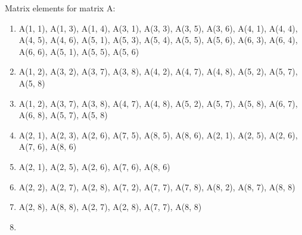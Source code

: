 \documentclass[11pt, fleqn]{article}
\begin{document}
\noindent
Matrix elements for matrix A:
\begin{enumerate}
	\item {} \begin{minipage}[t]{13cm}
													      A(1, 1), A(1, 3), A(1, 4), A(3, 1), A(3, 3), A(3, 5), A(3, 6), A(4, 1), A(4, 4), A(4, 5), A(4, 6), A(5, 1), A(5, 3), A(5, 4),
														  A(5, 5), A(5, 6), A(6, 3), A(6, 4), A(6, 6), {\color{blue} A(5, 1), A(5, 5), A(5, 6)}
													     \end{minipage}
	\item {} \begin{minipage}[t]{13cm}
														  A(1, 2), A(3, 2), A(3, 7), A(3, 8), A(4, 2), A(4, 7), A(4, 8), A(5, 2), A(5, 7), A(5, 8)
													     \end{minipage}
	\item {} \begin{minipage}[t]{13cm}
														  A(1, 2), A(3, 7), A(3, 8), A(4, 7), A(4, 8), A(5, 2), A(5, 7), A(5, 8), A(6, 7), A(6, 8), {\color{blue} A(5, 7), A(5, 8)}
														 \end{minipage} 
	\item {} \begin{minipage}[t]{13cm}
														 A(2, 1), A(2, 3), A(2, 6), A(7, 5), A(8, 5), A(8, 6), {\color{blue} A(2, 1), A(2, 5), A(2, 6), A(7, 6), A(8, 6)}
														 \end{minipage}
	\item {} \begin{minipage}[t]{13cm}
														  A(2, 1), A(2, 5), A(2, 6), A(7, 6), A(8, 6)
														 \end{minipage} 
	\item {} \begin{minipage}[t]{13cm}
														  A(2, 2), A(2, 7), A(2, 8), A(7, 2), A(7, 7), A(7, 8), A(8, 2), A(8, 7), A(8, 8)
														 \end{minipage} 
	\item {} \begin{minipage}[t]{13cm}
														  A(2, 8), A(8, 8), {\color{blue} A(2, 7), A(2, 8), A(7, 7), A(8, 8)}
														 \end{minipage} 
	\item {} \begin{minipage}[t]{13cm}

\end{minipage}
\end{enumerate}
\end{document}
